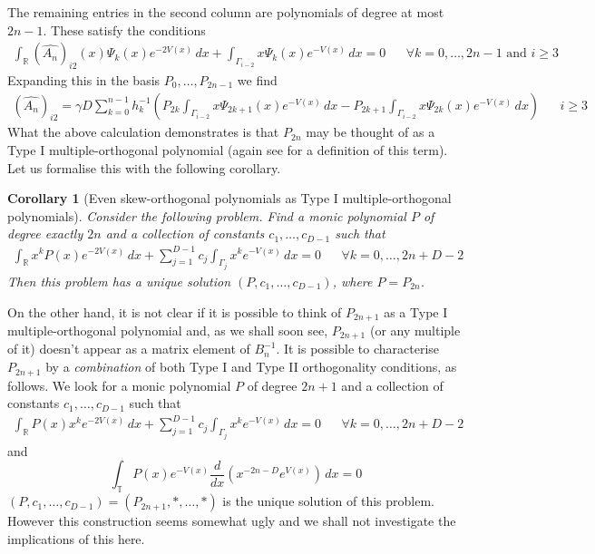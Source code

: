 \documentclass[12pt]{article}
\newtheorem{corollary}[theorem]{Corollary}
\theoremstyle{definition}
\begin{document}
The remaining entries in the second column are polynomials of degree at most $2n-1$.  These satisfy the conditions
\begin{align*}
\int_\mathbb{R} \left(\widehat{A_n}\right)_{i2}(x) \Psi_k(x) e^{-2V(x)}\, dx + \int_{\Gamma_{i-2}} x \Psi_k(x) e^{-V(x)}\, dx = 0 & & \forall k =0 , \dots, 2n-1 \text{ and } i\geq 3
\end{align*}
Expanding this in the basis $P_0, \dots, P_{2n-1}$ we find
\begin{align}\label{i2Ahat}
\left(\widehat{A_{n}}\right)_{i2} =\gamma D \sum_{k=0}^{n-1} h_k^{-1} \left( P_{2k} \int_{\Gamma_{i-2}} x \Psi_{2k +1}(x) e^{-V(x)}\, dx - P_{2k+1} \int_{\Gamma_{i-2}} x \Psi_{2k}(x) e^{-V(x)}\, dx \right) & & i\geq 3
\end{align}
What the above calculation demonstrates is that $P_{2n}$ may be thought of as a Type I multiple-orthogonal polynomial (again see \cite{Martinez_Finkelshtein_2016} for a definition of this term).  Let us formalise this with the following corollary.
\begin{corollary}[Even skew-orthogonal polynomials as Type I multiple-orthogonal polynomials]\label{typeI} Consider the following problem. Find a monic polynomial $P$ of degree exactly $2n$ and a collection of constants $c_1, \dots, c_{D-1}$ such that
\begin{align*}
\int_{\mathbb{R}} x^k P(x) e^{-2V(x)} \, dx + \sum_{j=1}^{D-1} c_j \int_{\Gamma_j} x^k e^{-V(x)}\, dx = 0 & & \forall k=0 , \dots, 2n+D-2
\end{align*}
Then this problem has a unique solution $(P, c_1, \dots, c_{D-1})$, where $P=P_{2n}$.
\end{corollary}
On the other hand, it is not clear if it is possible to think of $P_{2n+1}$ as a Type I multiple-orthogonal polynomial and, as we shall soon see, $P_{2n+1}$ (or any multiple of it) doesn't appear as a matrix element of $B_n^{-1}$.  It is possible to characterise $P_{2n+1}$ by a \textit{combination} of both Type I and Type II orthogonality conditions, as follows. We look for a monic polynomial $P$ of degree $2n+1$ and a collection of constants $c_1, \dots, c_{D-1}$ such that
\begin{align*}
\int_\mathbb{R} P(x) x^k e^{-2V(x)}\, dx + \sum_{j=1}^{D-1} c_j \int_{\Gamma_j} x^k e^{-V(x)} \, dx = 0 & & \forall k = 0,\dots, 2n+D-2
\end{align*}
and
$$ \int_\mathbb{T} P(x) e^{-V(x)} \frac{d}{dx}\left( x^{-2n-D} e^{V(x)} \right) \, dx = 0$$
$(P, c_1, \dots, c_{D-1})=(P_{2n+1}, \ast, \dots, \ast)$ is the unique solution of this problem. However this construction seems somewhat ugly and we shall not investigate the implications of this here.
\end{document}
